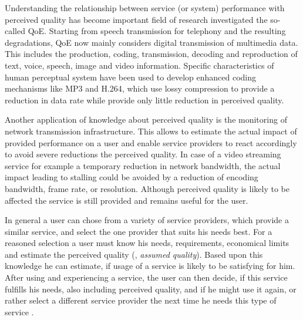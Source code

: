 Understanding the relationship between service (or system) performance with perceived quality has become important field of research investigated the so-called \ac{QoE}.
Starting from speech transmission for telephony \citep[\cf,][]{licgee_ieee_1969} and the resulting degradations, \ac{QoE} now mainly considers digital transmission of multimedia data. %
This includes the production, coding, transmission, decoding and reproduction of text, voice, speech, image and video information.
Specific characteristics of human perceptual system have been used to develop enhanced coding mechanisms like \ac{MP3} and \ac{H.264}, which use lossy compression to provide a reduction in data rate while provide only little reduction in perceived quality.

Another application of knowledge about perceived quality is the monitoring of network transmission infrastructure.
This allows to estimate the actual impact of provided performance on a user and enable service providers to react accordingly to avoid severe reductions the perceived quality.
In case of a video streaming service for example a temporary reduction in network bandwidth, the actual impact leading to stalling could be avoided by a reduction of encoding bandwidth, frame rate, or resolution.
Although perceived quality is likely to be affected the service is still provided and remains useful for the user.

In general a user can chose from a variety of service providers, which provide a similar service, and select the one provider that suits his needs best.
For a reasoned selection a user must know his needs, requirements, economical limits and estimate the perceived quality (\ie, \emph{assumed quality}).
Based upon this knowledge he can estimate, if usage of a service is likely to be satisfying for him.
After using and experiencing a service, the user can then decide, if this service fulfills his needs, also including perceived quality, and if he might use it again, or rather select a different service provider the next time he needs this type of service \citep[\cf,][]{geerts_linking_2010}.

